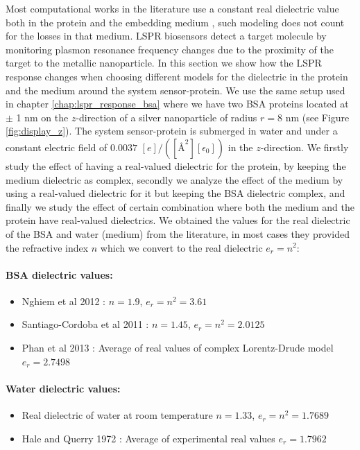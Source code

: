 Most computational works in the literature use a constant real dielectric value both in the protein and the
embedding medium \cite{NghiemETal2012, SantiagoCordobaETal2011,UngerETal2009}, such modeling does not count for the losses 
in that medium. LSPR biosensors detect a target molecule by monitoring plasmon resonance frequency changes due to the proximity 
of the target to the metallic nanoparticle. In this section we show how the LSPR response changes when choosing different models 
for the dielectric in the protein and the medium around the system sensor-protein. We use the same setup used in chapter \ref{chap:lspr_response_bsa}
where we have two BSA proteins located at $\pm$ 1 nm on the $z$-direction of a silver nanoparticle of radius $r=8$ nm (see 
Figure \ref{fig:display_z}). The system sensor-protein is submerged in water and under a constant electric field of 
$0.0037$ $[e]/([{\text{\AA}}^2][\epsilon_0])$ in the $z$-direction. We firstly study the effect of having a real-valued dielectric 
for the protein, by keeping the medium dielectric as complex, secondly we analyze the effect of the medium by using a real-valued 
dielectric for it but keeping the BSA dielectric complex, and finally we study the effect of certain combination where both the medium 
and the protein have real-valued dielectrics. We obtained the values for the real dielectric of the BSA and water (medium) from the literature,
in most cases they provided the refractive index $n$ which we convert to the real dielectric $e_r=n^2$:  

\paragraph{BSA dielectric values:}
\begin{itemize}
    \item {Nghiem et al 2012 \cite{NghiemETal2012}: $n=1.9$, $e_r = n^2 = 3.61$}
    \item {Santiago-Cordoba et al 2011 \cite{SantiagoCordobaETal2011}: $n=1.45$, $e_r = n^2 = 2.0125$}
    \item {Phan et al 2013 \cite{PhanETal2013}: Average of real values of complex Lorentz-Drude model $e_r = 2.7498$}
\end{itemize}

\paragraph{Water dielectric values:}
\begin{itemize}
    \item {Real dielectric of water at room temperature $n=1.33$, $e_r = n^2 = 1.7689$}
    \item {Hale and Querry 1972 \cite{HaleQuerry1972}: Average of experimental real values $e_r = 1.7962$}
\end{itemize}
  
